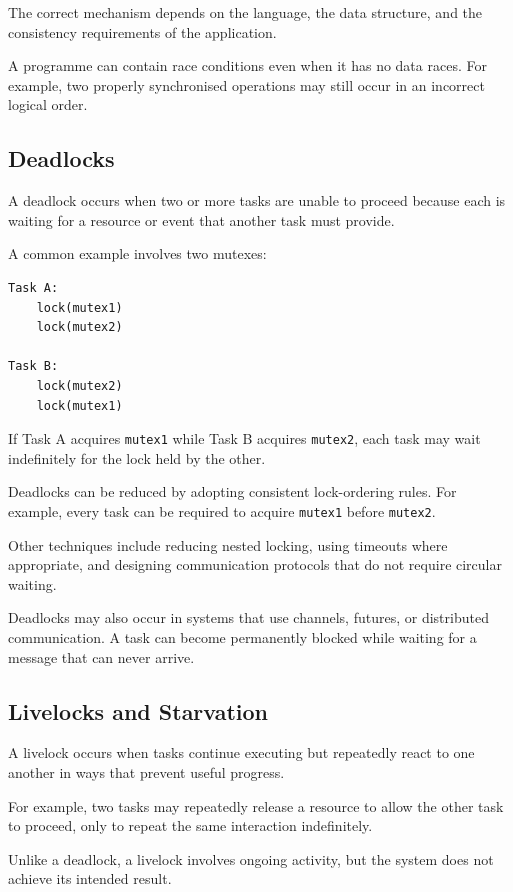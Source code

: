 The correct mechanism depends on the language, the data structure, and the consistency requirements of the application.

A programme can contain race conditions even when it has no data races. For example, two properly synchronised operations may still occur in an incorrect logical order.

\subsection{Deadlocks}

A deadlock occurs when two or more tasks are unable to proceed because each is waiting for a resource or event that another task must provide.

A common example involves two mutexes:

\begin{lstlisting}
Task A:
    lock(mutex1)
    lock(mutex2)

Task B:
    lock(mutex2)
    lock(mutex1)
\end{lstlisting}

If Task A acquires \texttt{mutex1} while Task B acquires \texttt{mutex2}, each task may wait indefinitely for the lock held by the other.

Deadlocks can be reduced by adopting consistent lock-ordering rules. For example, every task can be required to acquire \texttt{mutex1} before \texttt{mutex2}.

Other techniques include reducing nested locking, using timeouts where appropriate, and designing communication protocols that do not require circular waiting.

Deadlocks may also occur in systems that use channels, futures, or distributed communication. A task can become permanently blocked while waiting for a message that can never arrive.

\subsection{Livelocks and Starvation}

A livelock occurs when tasks continue executing but repeatedly react to one another in ways that prevent useful progress.

For example, two tasks may repeatedly release a resource to allow the other task to proceed, only to repeat the same interaction indefinitely.

Unlike a deadlock, a livelock involves ongoing activity, but the system does not achieve its intended result.

